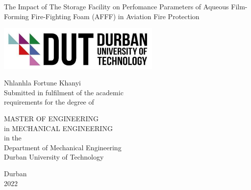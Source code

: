 \begin{titlepage}
\begin{center}

\doublespacing
\vspace*{1cm}

\large
The Impact of The Storage Facility on Perfomance Parameters of Aqueous Film-Forming Fire-Fighting Foam (AFFF) in Aviation Fire Protection

\vspace{2cm}

\includegraphics[width=0.6\textwidth]{images/logo.png}

\Large
Nhlanhla Fortune Khanyi \\

\large
Submitted in fulfilment of the academic\\
requirements for the degree of

\vspace{1.5cm}

MASTER OF ENGINEERING \\
in MECHANICAL ENGINEERING \\
in the \\

Department of Mechanical Engineering \\
Durban University of Technology

\vspace{1cm}

\normalsize
Durban \\
2022

\end{center}
\end{titlepage}